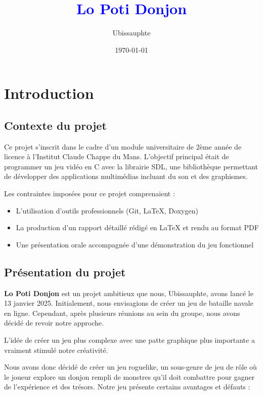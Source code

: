 \documentclass[a4paper,11pt]{article}
\begin{document}
\title{\huge{\textbf{\textcolor{blue}{Lo Poti Donjon}}}}
\author{\Large{Ubissauphte}}
\date{\today}
\maketitle
\newpage
\tableofcontents
\newpage

\section{Introduction}
\subsection{Contexte du projet}

Ce projet s'inscrit dans le cadre d'un module universitaire de 2ème année de licence à l'Institut Claude Chappe du Mans. L'objectif principal était de programmer un jeu vidéo en C avec la librairie SDL, une bibliothèque permettant de développer des applications multimédias incluant du son et des graphismes.

Les contraintes imposées pour ce projet comprenaient :
\begin{itemize}
    \item L'utilisation d'outils professionnels (Git, \LaTeX{}, Doxygen)
    \item La production d'un rapport détaillé rédigé en \LaTeX{} et rendu au format PDF
    \item Une présentation orale accompagnée d'une démonstration du jeu fonctionnel
\end{itemize}


\subsection{Présentation du projet}

\textbf{Lo Poti Donjon} est un projet ambitieux que nous, Ubissauphte, avons lancé le 13 janvier 2025. Initialement, nous envisagions de créer 
un jeu de bataille navale en ligne. Cependant, après plusieurs réunions au sein du groupe, nous avons décidé de revoir notre approche. 

L'idée de créer un jeu plus complexe avec une patte graphique plus importante a vraiment stimulé notre créativité.

Nous avons donc décidé de créer un jeu roguelike, un sous-genre de jeu de rôle où le joueur explore 
un donjon rempli de monstres qu'il doit combattre pour gagner de l'expérience et des trésors. Notre jeu présente certains avantages et défauts :
\end{document}
